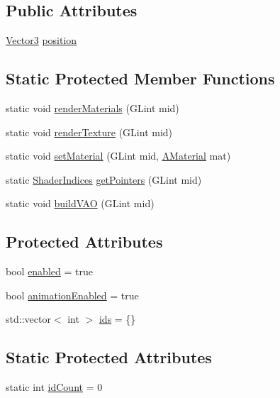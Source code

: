 \subsection*{Public Attributes}
\begin{DoxyCompactItemize}
\item 
\hyperlink{class_vector3}{Vector3} \hyperlink{class_game_object_abdc7864253235aced4171f9a6eeae6e1}{position}
\end{DoxyCompactItemize}
\subsection*{Static Protected Member Functions}
\begin{DoxyCompactItemize}
\item 
static void \hyperlink{class_game_object_a7607cef4104343b5b6b91c40f8045fbd}{render\+Materials} (G\+Lint mid)
\item 
static void \hyperlink{class_game_object_aac4766680e60cb120df6636e57c4d269}{render\+Texture} (G\+Lint mid)
\item 
static void \hyperlink{class_game_object_a9cf3bf44182a7b73c714e64981e3c510}{set\+Material} (G\+Lint mid, \hyperlink{struct_a_material}{A\+Material} mat)
\item 
static \hyperlink{struct_shader_indices}{Shader\+Indices} \hyperlink{class_game_object_a8fac812880b4c8c086b9263ffb2e88b3}{get\+Pointers} (G\+Lint mid)
\item 
static void \hyperlink{class_game_object_a9fc6cfc23e66aeb60bc6d3eb8ac0c351}{build\+V\+AO} (G\+Lint mid)
\end{DoxyCompactItemize}
\subsection*{Protected Attributes}
\begin{DoxyCompactItemize}
\item 
bool \hyperlink{class_game_object_a1ddc5fba8005a5269bfb282022f6f736}{enabled} = true
\item 
bool \hyperlink{class_game_object_a83e4944f434a732494fd3410ab2a0123}{animation\+Enabled} = true
\item 
std\+::vector$<$ int $>$ \hyperlink{class_game_object_a2213b69db0d43fe8b6a7badb176950f8}{ids} = \{\}
\end{DoxyCompactItemize}
\subsection*{Static Protected Attributes}
\begin{DoxyCompactItemize}
\item 
static int \hyperlink{class_game_object_a3410079d3cfee94a22b5d6a885991165}{id\+Count} = 0
\end{DoxyCompactItemize}


